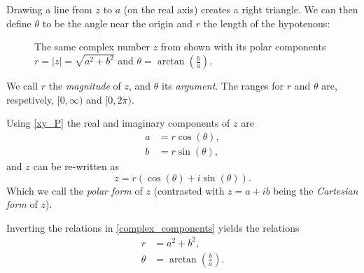 Drawing a line from $z$ to $a$ (on the real axis) creates a right triangle. We can then define $\theta$ to be the angle near the origin and $r$ the length of the hypotenous:
\begin{figure}
	\centering
	\caption{The same complex number $z$ from  shown with its polar components $r=|z|=\sqrt{a^{2}+b^{2}}$ and $\theta=\arctan\left( \frac{b}{a} \right)$.}
	\label{fig:complex number 2}
\end{figure}
We call $r$ the \emph{magnitude} of $z$, and $\theta$ its \emph{argument}. The ranges for $r$ and $\theta$ are, respetively, $[0,\infty)$ and $[0,2\pi)$.

Using \eqref{xy_P} the real and imaginary components of $z$ are
\begin{align}
	a &= r\cos(\theta),\nonumber\\
	b &= r\sin(\theta),
	\label{eq:complex_components}
\end{align}
and $z$ can be re-written as
\begin{equation}
	z = r\left( \cos(\theta) + i\sin(\theta) \right).
	\label{eq:complex_geometric_form}
\end{equation}
Which we call the \emph{polar form} of $z$ (contrasted with $z=a+ib$ being the \emph{Cartesian form} of $z$).

Inverting the relations in \eqref{complex_components} yields the relations
\begin{align}
	r &= a^{2}+b^{2},\nonumber\\
	\theta &= \arctan\left(\frac{b}{a}\right).
	\label{eq:complex_components_geometric}
\end{align}

